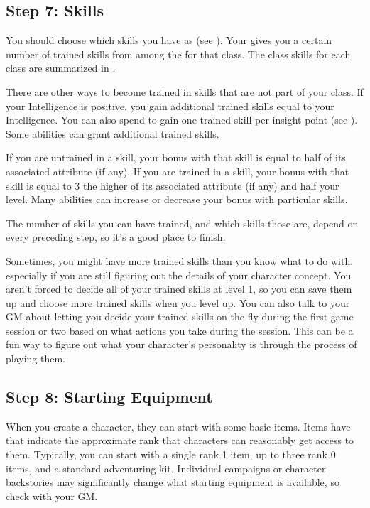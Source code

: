     \subsection{Step 7: Skills}
        You should choose which skills you have as  (see ).
        Your  gives you a certain number of trained skills from among the  for that class.
        The class skills for each class are summarized in .

        There are other ways to become trained in skills that are not part of your class.
        If your Intelligence is positive, you gain additional trained skills equal to your Intelligence.
        You can also spend  to gain one trained skill per insight point (see ).
        Some abilities can grant additional trained skills.

        If you are untrained in a skill, your bonus with that skill is equal to half of its associated attribute (if any).
        If you are trained in a skill, your bonus with that skill is equal to 3 \add the higher of its associated attribute (if any) and half your level.
        Many abilities can increase or decrease your bonus with particular skills.

        The number of skills you can have trained, and which skills those are, depend on every preceding step, so it's a good place to finish.

        Sometimes, you might have more trained skills than you know what to do with, especially if you are still figuring out the details of your character concept.
        You aren't forced to decide all of your trained skills at level 1, so you can save them up and choose more trained skills when you level up.
        You can also talk to your GM about letting you decide your trained skills on the fly during the first game session or two based on what actions you take during the session.
        This can be a fun way to figure out what your character's personality is through the process of playing them.

    \subsection{Step 8: Starting Equipment}
        When you create a character, they can start with some basic items.
        Items have  that indicate the approximate rank that characters can reasonably get access to them.
        Typically, you can start with a single rank 1 item, up to three rank 0 items, and a standard adventuring kit.
        Individual campaigns or character backstories may significantly change what starting equipment is available, so check with your GM.


